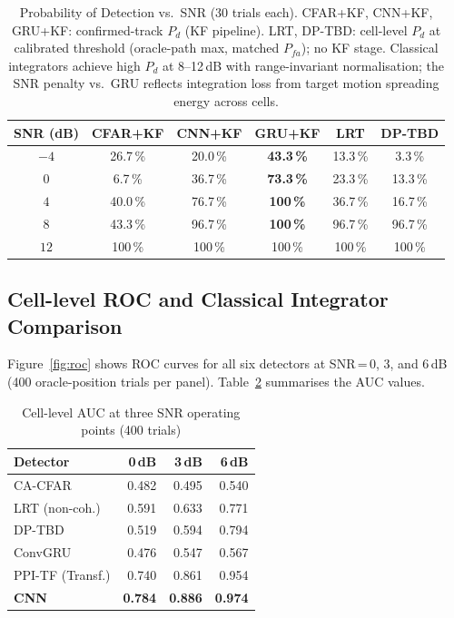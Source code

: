 \documentclass[conference]{IEEEtran}
\begin{document}
\begin{table}[h]
\caption{Probability of Detection vs.\ SNR (30 trials each).
         CFAR+KF, CNN+KF, GRU+KF: confirmed-track $P_d$ (KF pipeline).
         LRT, DP-TBD: cell-level $P_d$ at calibrated threshold
         (oracle-path max, matched $P_{fa}$); no KF stage.
         Classical integrators achieve high $P_d$ at 8--12\,dB with
         range-invariant normalisation; the SNR penalty vs.\ GRU reflects
         integration loss from target motion spreading energy across cells.}
\label{tab:pd}
\centering
\begin{tabular}{cccccc}
\toprule
SNR (dB) & CFAR+KF & CNN+KF & GRU+KF & LRT & DP-TBD \\
\midrule
$-4$ & 26.7\,\% & 20.0\,\% & \textbf{43.3\,\%} & 13.3\,\% & 3.3\,\%  \\
$0$  & 6.7\,\%  & 36.7\,\% & \textbf{73.3\,\%} & 23.3\,\% & 13.3\,\% \\
$4$  & 40.0\,\% & 76.7\,\% & \textbf{100\,\%}  & 36.7\,\% & 16.7\,\% \\
$8$  & 43.3\,\% & 96.7\,\% & \textbf{100\,\%}  & 96.7\,\% & 96.7\,\% \\
$12$ & 100\,\%  & 100\,\%  & 100\,\%           & 100\,\%  & 100\,\%  \\
\bottomrule
\end{tabular}
\end{table}

\subsection{Cell-level ROC and Classical Integrator Comparison}
\label{sec:results_roc}

Figure~\ref{fig:roc} shows ROC curves for all six detectors at SNR\,=\,0,
3, and 6\,dB (400 oracle-position trials per panel).
Table~\ref{tab:auc} summarises the AUC values.

\begin{table}[h]
\caption{Cell-level AUC at three SNR operating points (400 trials)}
\label{tab:auc}
\centering
\begin{tabular}{lrrr}
\toprule
Detector & 0\,dB & 3\,dB & 6\,dB \\
\midrule
CA-CFAR           & 0.482 & 0.495 & 0.540 \\
LRT (non-coh.)    & 0.591 & 0.633 & 0.771 \\
DP-TBD            & 0.519 & 0.594 & 0.794 \\
ConvGRU           & 0.476 & 0.547 & 0.567 \\
PPI-TF (Transf.)  & 0.740 & 0.861 & 0.954 \\
\textbf{CNN}      & \textbf{0.784} & \textbf{0.886} & \textbf{0.974} \\
\bottomrule
\end{tabular}
\end{table}
\end{document}
